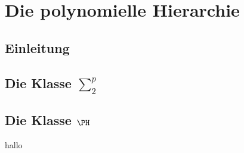 \section{Die polynomielle Hierarchie}
\subsection{Einleitung}

\subsection{Die Klasse $\sum_{2}^{p} $}

\subsection{Die Klasse $\PH$}

\begin{frame}
	hallo
\end{frame}